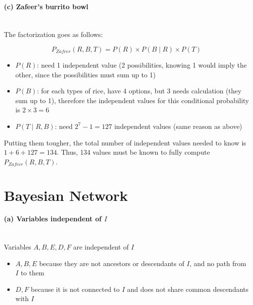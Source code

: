 \documentclass[12pt,letterpaper]{article}
\begin{document}
\paragraph{(c) Zafeer's burrito bowl}  \mbox{}\\

The factorization goes as follows: 

$$ P_{Zafeer}(R, B, T) = P(R) \times  P(B \mid R) \times P(T) $$

\begin{itemize}
    \item $P(R)$: need 1 independent value (2 possibilities, knowing 1 would imply the other, since the possibilities must sum up to 1)
    \item $P(B)$: for each types of rice, have 4 options, but 3 needs calculation (they sum up to 1), therefore the independent values for this conditional probability is $2 \times 3 = 6$ 
    \item $P(T \mid R, B)$: need $2^{7} - 1 = 127$ independent values (same reason as above)
\end{itemize}

Putting them tougher, the total number of independent values needed to know is $1 + 6 + 127  = 134$. Thus, 134 values must be known to fully compute $P_{Zafeer}(R, B, T)$.


\section*{Bayesian Network}


\paragraph{(a) Variables independent of $I$}  \mbox{}\\

Variables $A, B, E, D, F$ are independent of $I$

\begin{itemize}
    \item $A, B, E$ because they are not ancestors or descendants of $I$, and no path from $I$ to them
    \item $D, F$ because it is not connected to $I$ and does not share common descendants with $I$
\end{itemize}
\end{document}
